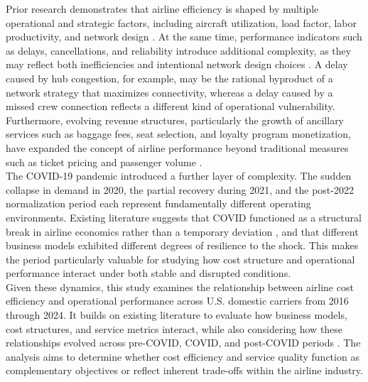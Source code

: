\documentclass[11pt, letterpaper]{article}
\begin{document}
\indent Prior research demonstrates that airline efficiency is shaped by multiple operational and strategic factors, including aircraft utilization, load factor, labor productivity, and network design \cite{Banker1993,Caves1984,Zuidberg2014}. At the same time, performance indicators such as delays, cancellations, and reliability introduce additional complexity, as they may reflect both inefficiencies and intentional network design choices \cite{Lee2023,MayerSinai2002}. A delay caused by hub congestion, for example, may be the rational byproduct of a network strategy that maximizes connectivity, whereas a delay caused by a missed crew connection reflects a different kind of operational vulnerability. Furthermore, evolving revenue structures, particularly the growth of ancillary services such as baggage fees, seat selection, and loyalty program monetization, have expanded the concept of airline performance beyond traditional measures such as ticket pricing and passenger volume \cite{Moghadasnian2025,Zhou2020}.\\
\indent The COVID-19 pandemic introduced a further layer of complexity. The sudden collapse in demand in 2020, the partial recovery during 2021, and the post-2022 normalization period each represent fundamentally different operating environments. Existing literature suggests that COVID functioned as a structural break in airline economics rather than a temporary deviation \cite{FontanetPerez2022,Gudmundsson2021}, and that different business models exhibited different degrees of resilience to the shock. This makes the period particularly valuable for studying how cost structure and operational performance interact under both stable and disrupted conditions.\\
\indent Given these dynamics, this study examines the relationship between airline cost efficiency and operational performance across U.S. domestic carriers from 2016 through 2024. It builds on existing literature to evaluate how business models, cost structures, and service metrics interact, while also considering how these relationships evolved across pre-COVID, COVID, and post-COVID periods \cite{FontanetPerez2022,Gudmundsson2021}. The analysis aims to determine whether cost efficiency and service quality function as complementary objectives or reflect inherent trade-offs within the airline industry.
\end{document}

